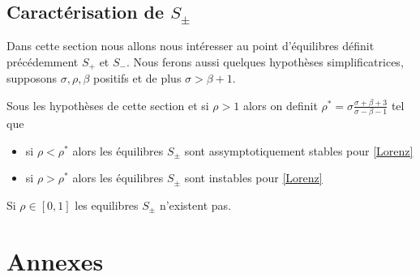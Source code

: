 \documentclass{article}
\newtheorem[M , nocut]{prop}{Proposition}[section]
\newtheorem[M]{propt}{Propriété}[section]
\newtheorem[L , nocut]{thm}{Théoreme}
\newtheorem[L]{cor}{Corollaire}
\begin{document}
\subsection{Caractérisation de $S_\pm$}

Dans cette section nous allons nous intéresser au point d'équilibres définit précédemment $S_+$ et $S_-$. Nous ferons aussi quelques hypothèses simplificatrices, supposons $\sigma,\rho,\beta$ positifs et de plus $\sigma>\beta+1$.

\begin{prop}
    Sous les hypothèses de cette section et si $\rho > 1$ alors on definit $\rho^* = \sigma \frac{\sigma+\beta+3}{\sigma-\beta-1}$ tel que 
    \begin{itemize}
        \item si $\rho < \rho^* $ alors les équilibres $S_\pm$ sont assymptotiquement stables pour \eqref{Lorenz}
        \item si $\rho > \rho^* $ alors les équilibres $S_\pm$ sont instables pour \eqref{Lorenz}
    \end{itemize}
\end{prop}

\begin{example}[Remarque]
    Si $\rho \in [0,1]$ les equilibres $S_\pm$ n'existent pas.
\end{example}
\section{Annexes}

\nocite{*}
\printbibliography[heading=bibintoc,title={Bibliographie}]
\end{document}

